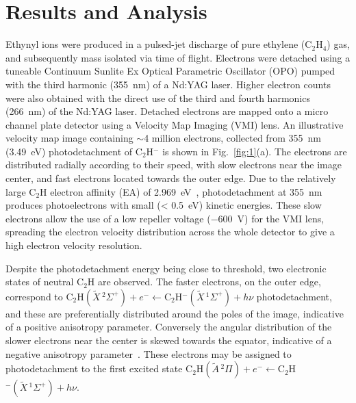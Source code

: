 \documentclass[aip,graphicx]{revtex4-1}
\begin{document}
\section{Results and Analysis}
Ethynyl ions were produced in a pulsed-jet discharge of pure ethylene (C$_2$H$_4$) gas, and subsequently mass isolated via time of flight. Electrons were detached using a tuneable Continuum Sunlite Ex Optical Parametric Oscillator (OPO) pumped with the third harmonic (355~nm) of a Nd:YAG laser. Higher electron counts were also obtained with the direct use of the third and fourth harmonics (266~nm) of the Nd:YAG laser. Detached electrons are mapped onto a micro channel plate detector using a Velocity Map Imaging (VMI) lens. An illustrative velocity map image containing $\sim$4 million electrons, collected from 355~nm (3.49~eV) photodetachment of C$_2$H$^-$ is shown in Fig.~\ref{fig:1}(a). The electrons are distributed radially according to their speed, with slow electrons near the image center, and fast electrons located towards the outer edge. Due to the relatively large C$_2$H electron affinity (EA) of 2.969~eV~\cite{erv91}, photodetachment at 355~nm produces photoelectrons with small (< 0.5~eV) kinetic energies. These slow electrons allow the use of a low repeller voltage ($-600$~V) for the VMI lens, spreading the electron velocity distribution across the whole detector to give a high electron velocity resolution. 

Despite the photodetachment energy being close to threshold, two electronic states of neutral C$_2$H are observed. The faster electrons, on the outer edge, correspond to C$_2$H$(\tilde{X}\,^2\Sigma^+)+e^- \leftarrow $C$_2$H$^-(\tilde{X}\,^1\Sigma^+)+h\nu$ photodetachment, and these are preferentially distributed around the poles of the image, indicative of a positive anisotropy parameter. Conversely the angular distribution of the slower electrons near the center is skewed towards the equator, indicative of a negative anisotropy parameter~\cite{buc70}. These electrons may be assigned to photodetachment to the first excited state C$_2$H$(\tilde{A}\,^2\Pi)+e^- \leftarrow $C$_2$H$^-(\tilde{X}\,^1\Sigma^+)+h\nu$.
\end{document}
